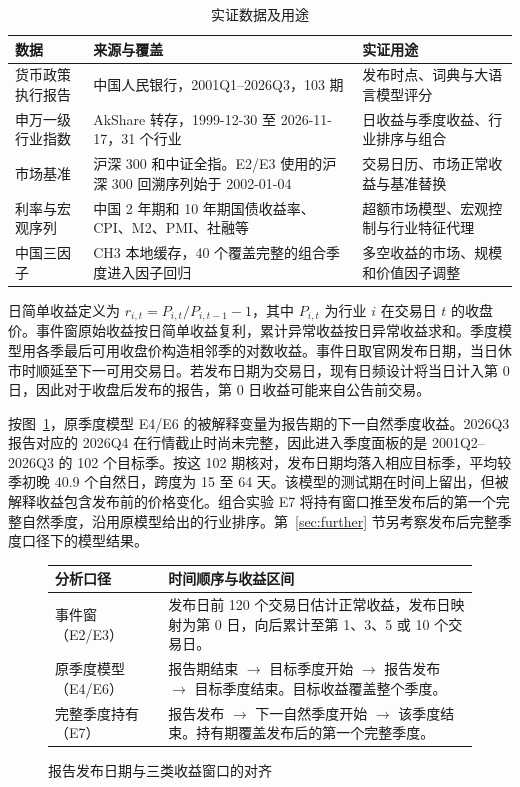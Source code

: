 \begin{table}[htbp]
  \centering\small
  \caption{实证数据及用途}
  \label{tab:datasets}
  \begin{tabularx}{\linewidth}{@{}p{.22\linewidth} X X@{}}
    \toprule
    数据 & 来源与覆盖 & 实证用途 \\
    \midrule
    货币政策执行报告 & 中国人民银行，2001Q1--2026Q3，103 期 & 发布时点、词典与大语言模型评分 \\
    申万一级行业指数 & AkShare 转存，1999-12-30 至 2026-11-17，31 个行业 & 日收益与季度收益、行业排序与组合 \\
    市场基准 & 沪深 300 和中证全指。E2/E3 使用的沪深 300 回溯序列始于 2002-01-04 & 交易日历、市场正常收益与基准替换 \\
    利率与宏观序列 & 中国 2 年期和 10 年期国债收益率、CPI、M2、PMI、社融等 & 超额市场模型、宏观控制与行业特征代理 \\
    中国三因子 & CH3 本地缓存，40 个覆盖完整的组合季度进入因子回归 & 多空收益的市场、规模和价值因子调整 \\
    \bottomrule
  \end{tabularx}
\end{table}

日简单收益定义为 $r_{i,t}=P_{i,t}/P_{i,t-1}-1$，其中 $P_{i,t}$ 为行业 $i$ 在交易日 $t$ 的收盘价。事件窗原始收益按日简单收益复利，累计异常收益按日异常收益求和。季度模型用各季最后可用收盘价构造相邻季的对数收益。事件日取官网发布日期，当日休市时顺延至下一可用交易日。若发布日期为交易日，现有日频设计将当日计入第 0 日，因此对于收盘后发布的报告，第 0 日收益可能来自公告前交易。

按图~\ref{fig:alignment}，原季度模型 E4/E6 的被解释变量为报告期的下一自然季度收益。2026Q3 报告对应的 2026Q4 在行情截止时尚未完整，因此进入季度面板的是 2001Q2--2026Q3 的 102 个目标季。按这 102 期核对，发布日期均落入相应目标季，平均较季初晚 40.9 个自然日，跨度为 15 至 64 天。该模型的测试期在时间上留出，但被解释收益包含发布前的价格变化。组合实验 E7 将持有窗口推至发布后的第一个完整自然季度，沿用原模型给出的行业排序。第~\ref{sec:further} 节另考察发布后完整季度口径下的模型结果。

\begin{figure}[htbp]
  \centering\small
  \begin{tabularx}{\linewidth}{@{}p{.25\linewidth} X@{}}
    \toprule
    分析口径 & 时间顺序与收益区间 \\
    \midrule
    事件窗（E2/E3） & 发布日前 120 个交易日估计正常收益，发布日映射为第 0 日，向后累计至第 1、3、5 或 10 个交易日。 \\
    原季度模型（E4/E6） & 报告期结束 $\longrightarrow$ 目标季度开始 $\longrightarrow$ 报告发布 $\longrightarrow$ 目标季度结束。目标收益覆盖整个季度。 \\
    完整季度持有（E7） & 报告发布 $\longrightarrow$ 下一自然季度开始 $\longrightarrow$ 该季度结束。持有期覆盖发布后的第一个完整季度。 \\
    \bottomrule
  \end{tabularx}
  \caption{报告发布日期与三类收益窗口的对齐}
  \label{fig:alignment}
\end{figure}

